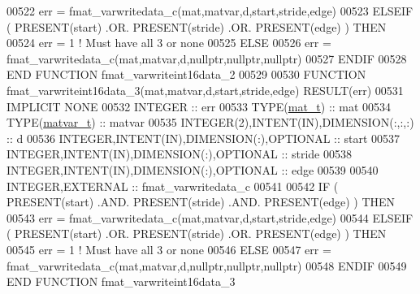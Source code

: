 \begin{DoxyCode}
00522         err = fmat\_varwritedata\_c(mat,matvar,d,start,stride,edge)
00523     \textcolor{keywordflow}{ELSEIF} ( \textcolor{keyword}{PRESENT}(start) .OR. \textcolor{keyword}{PRESENT}(stride) .OR. \textcolor{keyword}{PRESENT}(edge) ) \textcolor{keywordflow}{THEN}
00524         err = 1    \textcolor{comment}{! Must have all 3 or none}
00525     \textcolor{keywordflow}{ELSE}
00526         err = fmat\_varwritedata\_c(mat,matvar,d,nullptr,nullptr,nullptr)
00527 \textcolor{keywordflow}{    ENDIF}
00528 \textcolor{keyword}{END FUNCTION }fmat\_varwriteint16data\_2
00529 
00530 \textcolor{keyword}{FUNCTION }fmat\_varwriteint16data\_3(mat,matvar,d,start,stride,edge) \textcolor{keyword}{RESULT}(err)
00531 \textcolor{keywordtype}{IMPLICIT NONE}
00532     \textcolor{keywordtype}{INTEGER}                                  :: err
00533     \textcolor{keywordtype}{TYPE}(\hyperlink{group___m_a_t_gab0fc888f5a5d79943b16284b1f91c2e8}{mat\_t})                              :: mat
00534     \textcolor{keywordtype}{TYPE}(\hyperlink{group___m_a_t_structmatvar__t}{matvar\_t})                           :: matvar
00535     \textcolor{keywordtype}{INTEGER(2)},\textcolor{keywordtype}{INTENT(IN)},\textcolor{keywordtype}{DIMENSION(:,:,:)}   :: d
00536     \textcolor{keywordtype}{INTEGER},\textcolor{keywordtype}{INTENT(IN)},\textcolor{keywordtype}{DIMENSION(:)},\textcolor{keywordtype}{OPTIONAL} :: start
00537     \textcolor{keywordtype}{INTEGER},\textcolor{keywordtype}{INTENT(IN)},\textcolor{keywordtype}{DIMENSION(:)},\textcolor{keywordtype}{OPTIONAL} :: stride
00538     \textcolor{keywordtype}{INTEGER},\textcolor{keywordtype}{INTENT(IN)},\textcolor{keywordtype}{DIMENSION(:)},\textcolor{keywordtype}{OPTIONAL} :: edge
00539 
00540     \textcolor{keywordtype}{INTEGER},\textcolor{keywordtype}{EXTERNAL}                         :: fmat\_varwritedata\_c
00541 
00542     \textcolor{keywordflow}{IF} ( \textcolor{keyword}{PRESENT}(start) .AND. \textcolor{keyword}{PRESENT}(stride) .AND. \textcolor{keyword}{PRESENT}(edge) ) \textcolor{keywordflow}{THEN}
00543         err = fmat\_varwritedata\_c(mat,matvar,d,start,stride,edge)
00544     \textcolor{keywordflow}{ELSEIF} ( \textcolor{keyword}{PRESENT}(start) .OR. \textcolor{keyword}{PRESENT}(stride) .OR. \textcolor{keyword}{PRESENT}(edge) ) \textcolor{keywordflow}{THEN}
00545         err = 1    \textcolor{comment}{! Must have all 3 or none}
00546     \textcolor{keywordflow}{ELSE}
00547         err = fmat\_varwritedata\_c(mat,matvar,d,nullptr,nullptr,nullptr)
00548 \textcolor{keywordflow}{    ENDIF}
00549 \textcolor{keyword}{END FUNCTION }fmat\_varwriteint16data\_3

\end{DoxyCode}
